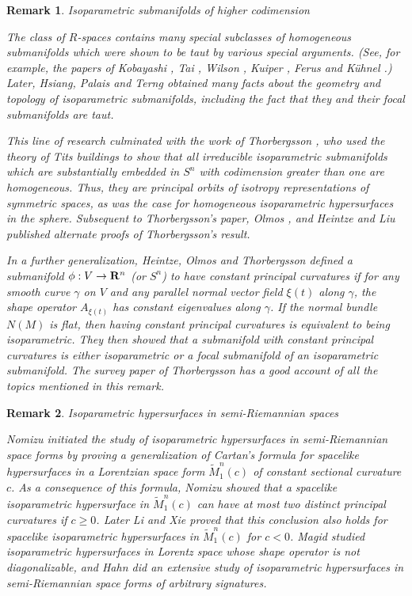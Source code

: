 \documentclass[12pt]{article}
\newtheorem{remark}{Remark}[section]
\begin{document}
{\begin{remark}{Isoparametric submanifolds of higher codimension}
{The class of $R$-spaces
contains many special subclasses of homogeneous submanifolds which
were shown to be taut by various special arguments.  (See, for
example, the papers of Kobayashi \cite{Kob}, Tai \cite{Tai}, Wilson
\cite{Wil}, Kuiper \cite{Ku3}, Ferus \cite{Fer} and K\"{u}hnel
\cite{Kuh}.) 
Later, Hsiang, Palais and Terng \cite{HPT} obtained many
facts about the geometry and topology of isoparametric submanifolds,
including the fact that they and their focal submanifolds are taut.


This line of research culminated with the work of
Thorbergsson \cite{Th2}, who used the theory of Tits buildings to show that all irreducible 
isoparametric submanifolds which are substantially embedded in $S^n$ with codimension greater than one are homogeneous.
Thus, they are
principal orbits of isotropy representations
of symmetric spaces, as was the case for homogeneous isoparametric hypersurfaces in the sphere.
Subsequent to Thorbergsson's paper, Olmos \cite{Olm}, and Heintze and Liu \cite{HL} published 
alternate proofs of Thorbergsson's result.  

In a further generalization,
Heintze, Olmos and Thorbergsson \cite{HOT} defined a submanifold $\phi:V \rightarrow {\bf R}^n$  (or $S^n$) 
to have {\em constant principal curvatures} if for any smooth
curve $\gamma$ on $V$ and any parallel normal vector field
$\xi(t)$ along $\gamma$, the shape operator $A_{\xi(t)}$ has
constant eigenvalues along $\gamma$.  If the normal bundle
$N(M)$ is flat, then having constant principal curvatures is
equivalent to being isoparametric.  They then
showed that a submanifold with constant principal curvatures is
either isoparametric or a focal submanifold of an isoparametric
submanifold.
The survey paper of Thorbergsson \cite{Th6} has a good account of all the topics mentioned in this remark.}
\end{remark}


\begin{remark}{Isoparametric hypersurfaces in semi-Riemannian spaces}
\label{rem:isop-hyp-pseudo-Riemann}


\noindent
{\rm Nomizu \cite{Nom3} initiated the study of isoparametric hypersurfaces in semi-Riemannian space forms
by proving a generalization of Cartan's formula for spacelike hypersurfaces in a Lorentzian space form
$\widetilde{M}^n_1(c)$ of constant sectional curvature $c$.  As a consequence of this formula, Nomizu showed that
a spacelike isoparametric hypersurface in $\widetilde{M}^n_1(c)$ can have at most two distinct principal curvatures
if $c \geq 0$. Later Li and Xie \cite{LX} proved that this conclusion also holds for spacelike isoparametric
hypersurfaces in $\widetilde{M}^n_1(c)$ for $c<0$.
Magid \cite{Mag} studied isoparametric hypersurfaces in Lorentz space whose shape operator is not diagonalizable,
and Hahn \cite{Hahn} did an extensive study of isoparametric hypersurfaces in semi-Riemannian space forms of arbitrary signatures.}
\end{remark}





}
\end{document}
